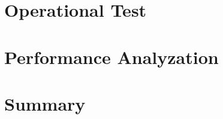 

\section{Operational Test}
\label{sec:operational-test}

\section{Performance Analyzation}
\label{sec:performance-analyzation}

\section{Summary}
\label{sec:evaluation-summary}


%
%


